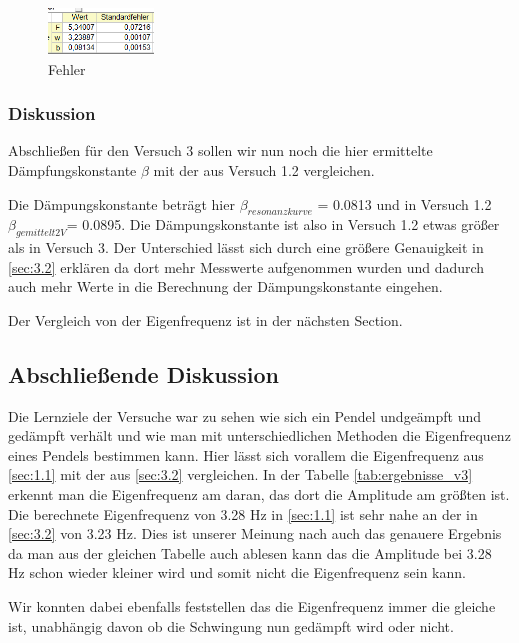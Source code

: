             \begin{figure}[H]
                \centering
                \includegraphics[width=0.25\textwidth]{bilder/fehler_v3.png}
                \caption{Fehler}
                \label{fig:fehler}
            \end{figure}
            \newpage
        \subsubsection{Diskussion}
        Abschließen für den Versuch 3 sollen wir nun noch die hier ermittelte Dämpfungskonstante $\beta$ mit der aus Versuch 1.2 vergleichen. 

        Die Dämpungskonstante beträgt hier $\beta_{resonanzkurve}$ = 0.0813 und in Versuch 1.2 $\beta_{gemittelt2V}$= 0.0895. Die Dämpungskonstante ist also in Versuch 1.2 etwas größer als in Versuch 3. Der Unterschied lässt sich durch eine größere Genauigkeit in \ref{sec:3.2} erklären da dort mehr Messwerte aufgenommen wurden und dadurch auch mehr Werte in die Berechnung der Dämpungskonstante eingehen.

        Der Vergleich von der Eigenfrequenz ist in der nächsten Section. 

    \subsection{Abschließende Diskussion}
    Die Lernziele der Versuche war zu sehen wie sich ein Pendel undgeämpft und gedämpft verhält und wie man mit unterschiedlichen Methoden die Eigenfrequenz eines Pendels bestimmen kann. Hier lässt sich vorallem die Eigenfrequenz aus \ref{sec:1.1} mit der aus \ref{sec:3.2} vergleichen. In der Tabelle \ref{tab:ergebnisse_v3} erkennt man die Eigenfrequenz am daran, das dort die Amplitude am größten ist. Die berechnete Eigenfrequenz von 3.28 Hz in \ref{sec:1.1} ist sehr nahe an der in \ref{sec:3.2} von 3.23 Hz. Dies ist unserer Meinung nach auch das genauere Ergebnis da man aus der gleichen Tabelle auch ablesen kann das die Amplitude bei 3.28 Hz schon wieder kleiner wird und somit nicht die Eigenfrequenz sein kann.
    
    Wir konnten dabei ebenfalls feststellen das die Eigenfrequenz immer die gleiche ist, unabhängig davon ob die Schwingung nun gedämpft wird oder nicht.